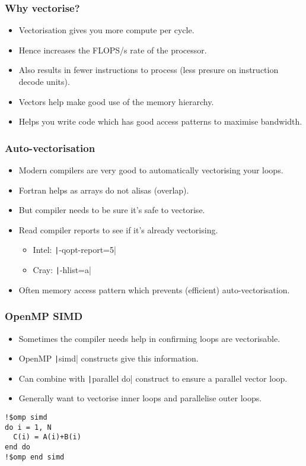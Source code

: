 \documentclass{beamer}
\begin{document}
\begin{frame}
\frametitle{Why vectorise?}
\begin{itemize}
  \item Vectorisation gives you more compute per cycle.
  \item Hence increases the FLOPS/s rate of the processor.
  \item Also results in fewer instructions to process (less presure on instruction decode units).
  \item Vectors help make good use of the memory hierarchy.
  \item Helps you write code which has good access patterns to maximise bandwidth.
\end{itemize}
\end{frame}

\begin{frame}
\frametitle{Auto-vectorisation}
\begin{itemize}
  \item Modern compilers are very good to automatically vectorising your loops.
  \item Fortran helps as arrays do not alisas (overlap).
  \item But compiler needs to be sure it's safe to vectorise.
  \item Read compiler reports to see if it's already vectorising.
    \begin{itemize}
      \item Intel: \texttt|-qopt-report=5|
      \item Cray: \texttt|-hlist=a|
    \end{itemize}
  \item Often memory access pattern which prevents (efficient) auto-vectorisation.
\end{itemize}
\end{frame}

\begin{frame}[fragile]
\frametitle{OpenMP SIMD}
\begin{itemize}
  \item Sometimes the compiler needs help in confirming loops are vectorisable.
  \item OpenMP \texttt|simd| constructs give this information.
  \item Can combine with \texttt|parallel do| construct to ensure a parallel vector loop.
  \item Generally want to vectorise inner loops and parallelise outer loops.
\end{itemize}

\begin{verbatim}
!$omp simd
do i = 1, N
  C(i) = A(i)+B(i)
end do
!$omp end simd
\end{verbatim}
\end{frame}
\end{document}
